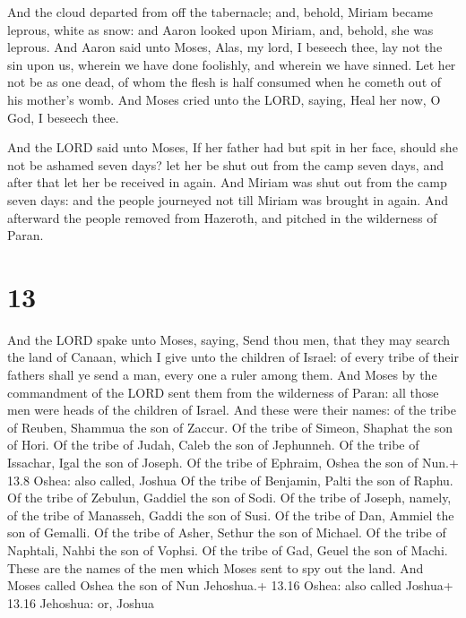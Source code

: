  And the cloud departed from off the tabernacle; and,
behold, Miriam became leprous, white as snow: and Aaron looked upon
Miriam, and, behold, she was leprous.  And Aaron said unto
Moses, Alas, my lord, I beseech thee, lay not the sin upon us, wherein
we have done foolishly, and wherein we have sinned.  Let
her not be as one dead, of whom the flesh is half consumed when he
cometh out of his mother's womb.  And Moses cried unto the
LORD, saying, Heal her now, O God, I beseech thee.

 And the LORD said unto Moses, If her father had but spit
in her face, should she not be ashamed seven days? let her be shut out
from the camp seven days, and after that let her be received in again.
 And Miriam was shut out from the camp seven days: and the
people journeyed not till Miriam was brought in again.  And
afterward the people removed from Hazeroth, and pitched in the
wilderness of Paran.

\hypertarget{section-12}{%
\section{13}\label{section-12}}

 And the LORD spake unto Moses, saying,  Send
thou men, that they may search the land of Canaan, which I give unto the
children of Israel: of every tribe of their fathers shall ye send a man,
every one a ruler among them.  And Moses by the commandment
of the LORD sent them from the wilderness of Paran: all those men were
heads of the children of Israel.  And these were their
names: of the tribe of Reuben, Shammua the son of Zaccur. 
Of the tribe of Simeon, Shaphat the son of Hori.  Of the
tribe of Judah, Caleb the son of Jephunneh.  Of the tribe of
Issachar, Igal the son of Joseph.  Of the tribe of Ephraim,
Oshea the son of Nun.+ 13.8 Oshea: also called, Joshua  Of
the tribe of Benjamin, Palti the son of Raphu.  Of the
tribe of Zebulun, Gaddiel the son of Sodi.  Of the tribe of
Joseph, namely, of the tribe of Manasseh, Gaddi the son of Susi.
 Of the tribe of Dan, Ammiel the son of Gemalli.
 Of the tribe of Asher, Sethur the son of Michael.
 Of the tribe of Naphtali, Nahbi the son of Vophsi.
 Of the tribe of Gad, Geuel the son of Machi. 
These are the names of the men which Moses sent to spy out the land. And
Moses called Oshea the son of Nun Jehoshua.+ 13.16 Oshea: also called
Joshua+ 13.16 Jehoshua: or, Joshua


